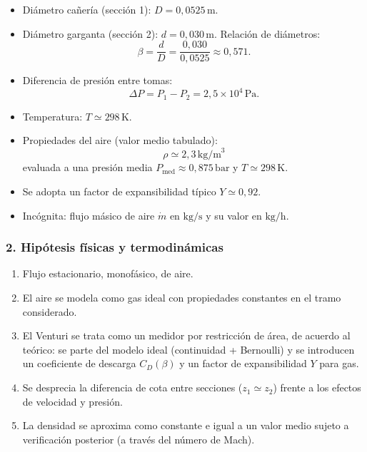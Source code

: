 \documentclass[12pt, a4paper]{article}
\begin{document}
\begin{itemize}
  \item Diámetro cañería (sección 1): $D = 0{,}0525\,\text{m}$.
  \item Diámetro garganta (sección 2): $d = 0{,}030\,\text{m}$.
        Relación de diámetros:
        \[
        \beta = \frac{d}{D} = \frac{0{,}030}{0{,}0525} \approx 0{,}571.
        \]
  \item Diferencia de presión entre tomas:
        \[
        \Delta P = P_1 - P_2 = 2{,}5\times 10^4\,\text{Pa}.
        \]
  \item Temperatura: $T \simeq 298\,\text{K}$.
  \item Propiedades del aire (valor medio tabulado): 
        \[
        \rho \simeq 2{,}3\,\text{kg/m}^3
        \]
        evaluada a una presión media $P_\text{med} \approx 0{,}875\,\text{bar}$ 
        y $T \simeq 298\,\text{K}$.
  \item Se adopta un factor de expansibilidad típico $Y \simeq 0{,}92$.
  \item Incógnita: flujo másico de aire $\dot m$ en $\text{kg/s}$ y su valor en $\text{kg/h}$.
\end{itemize}

\subsubsection*{2. Hipótesis físicas y termodinámicas}

\begin{enumerate}
  \item Flujo estacionario, monofásico, de aire.
  \item El aire se modela como gas ideal con propiedades constantes en el tramo considerado.
  \item El Venturi se trata como un medidor por restricción de área, de acuerdo al teórico:
        se parte del modelo ideal (continuidad + Bernoulli) y se introducen 
        un coeficiente de descarga $C_D(\beta)$ y un factor de expansibilidad $Y$ para gas.
  \item Se desprecia la diferencia de cota entre secciones 
        ($z_1 \simeq z_2$) frente a los efectos de velocidad y presión.
  \item La densidad se aproxima como constante e igual a un valor medio sujeto a verificación
        posterior (a través del número de Mach).
\end{enumerate}
\end{document}
